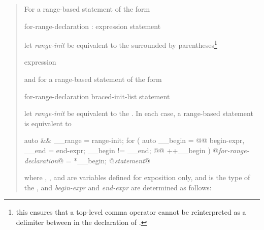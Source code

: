 \begin{quote}
\pnum
For a range-based  statement of the form

\begin{ncbnf}
     \terminal{(} for-range-declaration : expression \terminal{)} statement
\end{ncbnf}

let \textit{range-init} be equivalent to the  surrounded
by parentheses\footnote{this ensures that a top-level comma operator cannot be
  reinterpreted as a delimiter between  in the
  declaration of .}

\begin{ncbnf}
  \terminal{(} expression \terminal{)}
\end{ncbnf}

and for a range-based  statement of the form

\begin{ncbnf}
    \terminal{(} for-range-declaration \terminal{:} braced-init-list \terminal{)} statement
\end{ncbnf}

let \textit{range-init} be equivalent to the . In each case, a
range-based  statement
is equivalent to

\begin{codeblock}
  {
    auto && __range = range-init;
    for ( auto __begin =  @@ begin-expr,
    __end = end-expr;
    __begin != __end;
     @@ ++__begin ) {
      @\textit{for-range-declaration}@ = *__begin;
      @\textit{statement}@
    }
  }
\end{codeblock}

where 
\linebreak
{}, , and  are variables defined for
exposition only, and  is the type of the
, and \textit{begin-expr} and \textit{end-expr} are
determined as follows:



\end{quote}

